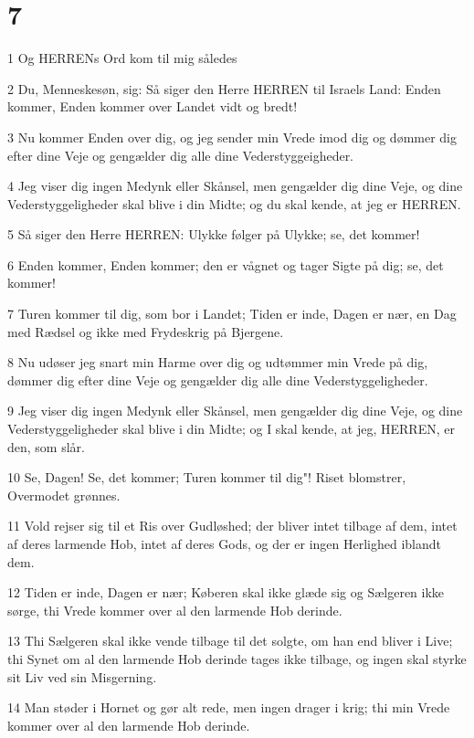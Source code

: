 \chapter{7}

\par 1 Og HERRENs Ord kom til mig således
\par 2 Du, Menneskesøn, sig: Så siger den Herre HERREN til Israels Land: Enden kommer, Enden kommer over Landet vidt og bredt!
\par 3 Nu kommer Enden over dig, og jeg sender min Vrede imod dig og dømmer dig efter dine Veje og gengælder dig alle dine Vederstyggeigheder.
\par 4 Jeg viser dig ingen Medynk eller Skånsel, men gengælder dig dine Veje, og dine Vederstyggeligheder skal blive i din Midte; og du skal kende, at jeg er HERREN.
\par 5 Så siger den Herre HERREN: Ulykke følger på Ulykke; se, det kommer!
\par 6 Enden kommer, Enden kommer; den er vågnet og tager Sigte på dig; se, det kommer!
\par 7 Turen kommer til dig, som bor i Landet; Tiden er inde, Dagen er nær, en Dag med Rædsel og ikke med Frydeskrig på Bjergene.
\par 8 Nu udøser jeg snart min Harme over dig og udtømmer min Vrede på dig, dømmer dig efter dine Veje og gengælder dig alle dine Vederstyggeligheder.
\par 9 Jeg viser dig ingen Medynk eller Skånsel, men gengælder dig dine Veje, og dine Vederstyggeligheder skal blive i din Midte; og I skal kende, at jeg, HERREN, er den, som slår.
\par 10 Se, Dagen! Se, det kommer; Turen kommer til dig"! Riset blomstrer, Overmodet grønnes.
\par 11 Vold rejser sig til et Ris over Gudløshed; der bliver intet tilbage af dem, intet af deres larmende Hob, intet af deres Gods, og der er ingen Herlighed iblandt dem.
\par 12 Tiden er inde, Dagen er nær; Køberen skal ikke glæde sig og Sælgeren ikke sørge, thi Vrede kommer over al den larmende Hob derinde.
\par 13 Thi Sælgeren skal ikke vende tilbage til det solgte, om han end bliver i Live; thi Synet om al den larmende Hob derinde tages ikke tilbage, og ingen skal styrke sit Liv ved sin Misgerning.
\par 14 Man støder i Hornet og gør alt rede, men ingen drager i krig; thi min Vrede kommer over al den larmende Hob derinde.
